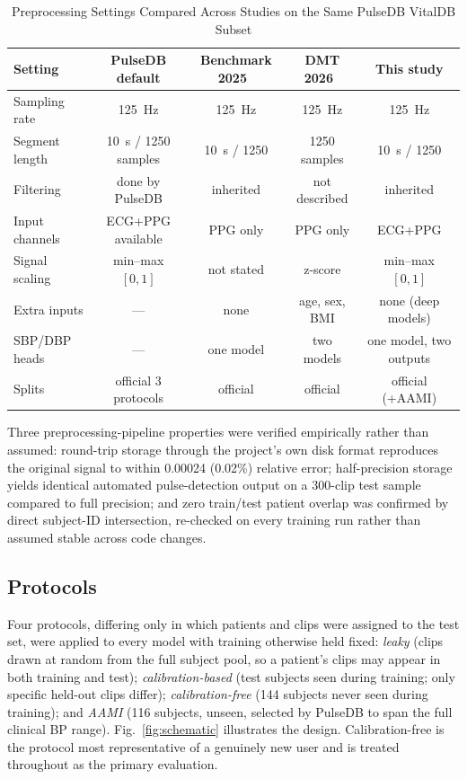 \documentclass[journal]{IEEEtran}
\begin{document}
\begin{table}[!t]
\caption{Preprocessing Settings Compared Across Studies on the Same PulseDB VitalDB Subset}
\label{tab:preproc}
\centering
\begin{tabular}{lcccc}
\toprule
Setting & PulseDB default & Benchmark 2025~\cite{moulaeifard2025} & DMT 2026~\cite{shen2026} & This study \\
\midrule
Sampling rate & 125~Hz & 125~Hz & 125~Hz & 125~Hz \\
Segment length & 10~s / 1250 samples & 10~s / 1250 & 1250 samples & 10~s / 1250 \\
Filtering & done by PulseDB & inherited & not described & inherited \\
Input channels & ECG+PPG available & PPG only & PPG only & ECG+PPG \\
Signal scaling & min--max $[0,1]$ & not stated & z-score & min--max $[0,1]$ \\
Extra inputs & --- & none & age, sex, BMI & none (deep models) \\
SBP/DBP heads & --- & one model & two models & one model, two outputs \\
Splits & official 3 protocols & official & official & official (+AAMI) \\
\bottomrule
\end{tabular}
\end{table}

Three preprocessing-pipeline properties were verified empirically rather than assumed: round-trip storage through the project's own disk format reproduces the original signal to within 0.00024 (0.02\%) relative error; half-precision storage yields identical automated pulse-detection output on a 300-clip test sample compared to full precision; and zero train/test patient overlap was confirmed by direct subject-ID intersection, re-checked on every training run rather than assumed stable across code changes.

\subsection{Protocols}
Four protocols, differing only in which patients and clips were assigned to the test set, were applied to every model with training otherwise held fixed: \textit{leaky} (clips drawn at random from the full subject pool, so a patient's clips may appear in both training and test); \textit{calibration-based} (test subjects seen during training; only specific held-out clips differ); \textit{calibration-free} (144 subjects never seen during training); and \textit{AAMI} (116 subjects, unseen, selected by PulseDB to span the full clinical BP range). Fig.~\ref{fig:schematic} illustrates the design. Calibration-free is the protocol most representative of a genuinely new user and is treated throughout as the primary evaluation.
\end{document}
